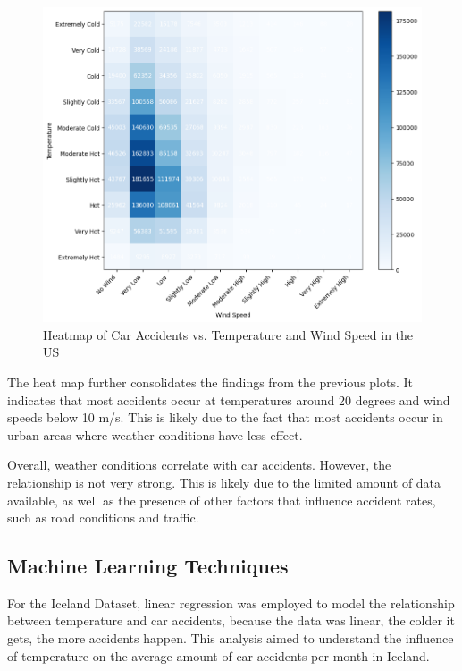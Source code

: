 \documentclass{article}
\begin{document}
\begin{figure}
    \centering
    \includegraphics[scale=0.4]{../figures/highres/usa_heatmap.png}
    \caption{Heatmap of Car Accidents vs. Temperature and Wind Speed in the US}
    \label{fig:usa_heatmap}
\end{figure}

The heat map further consolidates the findings from the previous plots. It indicates that most accidents occur at temperatures around 20 degrees and wind speeds below 10 m/s. This is likely due to the fact that most accidents occur in urban areas where weather conditions have less effect.

Overall, weather conditions correlate with car accidents. However, the relationship is not very strong. This is likely due to the limited amount of data available, as well as the presence of other factors that influence accident rates, such as road conditions and traffic.


\subsection{Machine Learning Techniques}

For the Iceland Dataset, linear regression \cite{linear_regression} was employed to model the relationship between temperature and car accidents, because the data was linear, the colder it gets, the more accidents happen. This analysis aimed to understand the influence of temperature on the average amount of car accidents per month in Iceland.
\end{document}
